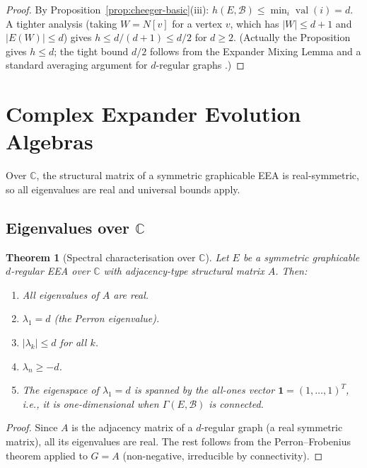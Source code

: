 \documentclass[12pt,a4paper]{amsart}
\newtheorem{theorem}{Theorem}[section]
\theoremstyle{definition}
\DeclareMathOperator{\val}{val}
\newcommand{\C}{\mathbb{C}}
\newcommand{\hh}{h}          %
\newcommand{\EA}{E}          %
\newcommand{\natbasis}{\mathcal{B}}  %
\newcommand{\strmat}{A}      %
\begin{document}
\begin{proof}
By Proposition~\ref{prop:cheeger-basic}(iii):
$\hh(\EA,\natbasis)\le\min_i\val(i)=d$.  A tighter analysis (taking
$W=N[v]$ for a vertex $v$, which has $|W|\le d+1$ and $|E(W)|\le d$)
gives $h\le d/(d+1)\le d/2$ for $d\ge 2$.  (Actually the
Proposition gives $h\le d$; the tight bound $d/2$ follows from the
Expander Mixing Lemma and a standard averaging argument for $d$-regular
graphs \cite[Lemma~3.1.4]{Kowalski2019}.)
\end{proof}

\section{Complex Expander Evolution Algebras}\label{sec:complex}

Over $\C$, the structural matrix of a symmetric graphicable EEA is real-symmetric, so all eigenvalues are real and universal bounds apply.

\subsection{Eigenvalues over $\C$}

\begin{theorem}[Spectral characterisation over $\C$]\label{thm:spectral-C}
Let $\EA$ be a symmetric graphicable $d$-regular EEA over $\C$ with
adjacency-type structural matrix $\strmat$.  Then:
\begin{enumerate}[label=\normalfont(\roman*)]
  \item All eigenvalues of $\strmat$ are real.
  \item $\lambda_1=d$ (the Perron eigenvalue).
  \item $|\lambda_k|\le d$ for all $k$.
  \item $\lambda_n\ge -d$.
  \item The eigenspace of $\lambda_1=d$ is spanned by the all-ones
        vector $\mathbf{1}=(1,\ldots,1)^T$, i.e., it is one-dimensional
        when $\varGamma(\EA,\natbasis)$ is connected.
\end{enumerate}
\end{theorem}

\begin{proof}
Since $\strmat$ is the adjacency matrix of a $d$-regular graph (a real
symmetric matrix), all its eigenvalues are real.  The rest follows from
the Perron--Frobenius theorem applied to $G=\strmat$ (non-negative,
irreducible by connectivity).
\end{proof}
\end{document}
